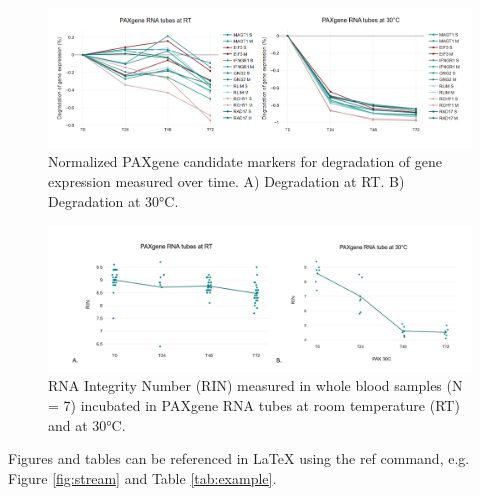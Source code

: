 \documentclass[fleqn,10pt]{wlscirep}
\begin{document}
\begin{figure}[ht]
    \centering
    \includegraphics[width=\linewidth]{figure6}
    \caption{Normalized PAXgene candidate markers for degradation of gene expression measured over time. A) Degradation at RT. B) Degradation at 30°C.}
    \label{fig:figure6}
    \end{figure}


\begin{figure}[ht]
    \centering
    \includegraphics[width=\linewidth]{fig7}
    \caption{RNA Integrity Number (RIN) measured in whole blood samples (N = 7) incubated in PAXgene RNA tubes at room temperature (RT) and at 30°C.}
    \label{fig:figure7}
    \end{figure}

Figures and tables can be referenced in LaTeX using the ref command, e.g. Figure \ref{fig:stream} and Table \ref{tab:example}.
\end{document}
